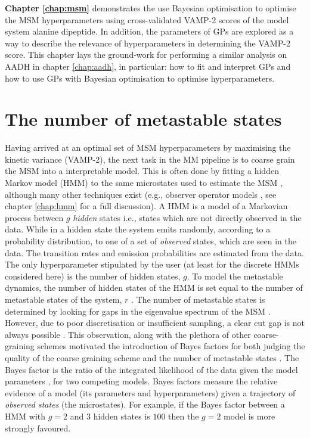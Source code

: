 \textbf{Chapter \ref{chap:msm}} demonstrates the use Bayesian optimisation to optimise the MSM hyperparameters using cross-validated VAMP-2 scores of the model system alanine dipeptide. In addition, the parameters of GPs are explored as a way to describe the relevance of hyperparameters in determining the VAMP-2 score. This chapter lays the ground-work for performing a similar analysis on AADH in chapter \ref{chap:aadh}, in particular: how to fit and interpret GPs and how to use GPs with Bayesian optimisation to optimise hyperparameters. 

\section{The number of metastable states}
Having arrived at an optimal set of MSM hyperparameters by maximising the kinetic variance (VAMP-2), the next task in the MM pipeline is to coarse grain the MSM into a interpretable model. This is often done by fitting a hidden Markov model (HMM) to the same microstates used to estimate the MSM \cite{noeMarkovModelsMolecular2019b}, although many other techniques exist (e.g., observer operator models \cite{wuProjectedMetastableMarkov2015}, see chapter \ref{chap:hmm} for a full discussion). A HMM is a model of a Markovian process between $g$ \emph{hidden} states i.e., states which are not directly observed in the data. While in a hidden state the system emits randomly, according to a probability distribution, to one of a set of \emph{observed} states, which are seen in the data. The transition rates and emission probabilities are estimated from the data.  The only hyperparameter stipulated by the user (at least for the discrete HMMs considered here) is the number of hidden states, $g$. To model the metastable dynamics, the number of hidden states of the HMM is set equal to the number of metastable states of the system, $r$ \cite{noeProjectedHiddenMarkov2013a}. The number of metastable states is determined by looking for gaps in the eigenvalue spectrum of the MSM \cite{prinzMarkovModelsMolecular2011,noeProjectedHiddenMarkov2013a}. However, due to poor discretisation or insufficient sampling, a clear cut gap is not always possible \cite{bowmanQuantitativeComparisonAlternative2013}. This observation, along with the plethora of other coarse-graining schemes motivated the introduction of Bayes factors \cite{kassBayesFactors1995} for both judging the quality of the coarse graining scheme and the number of metastable states \cite{bacalladoBayesianComparisonMarkov2009a}. The Bayes factor is the ratio of the integrated likelihood of the data given the model parameters \cite{kassBayesFactors1995}, for two competing models. Bayes factors measure the relative evidence of a model (its parameters and hyperparameters) given a trajectory of \emph{observed states} (the microstates). For example, if the Bayes factor between a HMM with $g=2$ and  $3$ hidden states is $100$ then the $g=2$ model is more strongly favoured. 

